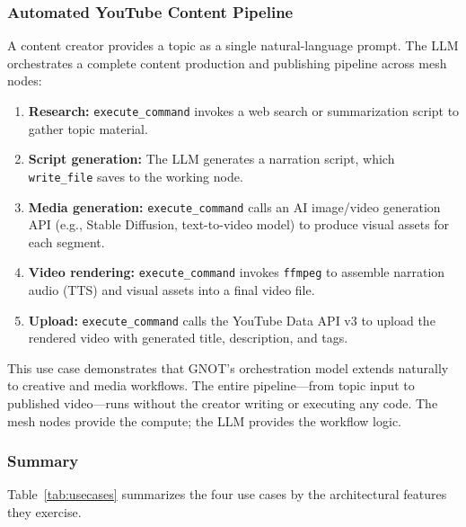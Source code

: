 \documentclass[10pt,twocolumn]{article}
\begin{document}
\subsubsection{Automated YouTube Content Pipeline}

A content creator provides a topic as a single natural-language prompt.
The LLM orchestrates a complete content production and publishing
pipeline across mesh nodes:

\begin{enumerate}[noitemsep, leftmargin=14pt]
  \item \textbf{Research:} \texttt{execute\_command} invokes a web
    search or summarization script to gather topic material.
  \item \textbf{Script generation:} The LLM generates a narration
    script, which \texttt{write\_file} saves to the working node.
  \item \textbf{Media generation:} \texttt{execute\_command} calls
    an AI image/video generation API (e.g., Stable Diffusion,
    text-to-video model) to produce visual assets for each segment.
  \item \textbf{Video rendering:} \texttt{execute\_command} invokes
    \texttt{ffmpeg} to assemble narration audio (TTS) and visual
    assets into a final video file.
  \item \textbf{Upload:} \texttt{execute\_command} calls the YouTube
    Data API v3 to upload the rendered video with generated title,
    description, and tags.
\end{enumerate}

This use case demonstrates that GNOT's orchestration model extends
naturally to creative and media workflows. The entire pipeline---from
topic input to published video---runs without the creator writing or
executing any code. The mesh nodes provide the compute; the LLM
provides the workflow logic.

\subsubsection{Summary}

Table~\ref{tab:usecases} summarizes the four use cases by the
architectural features they exercise.
\end{document}
